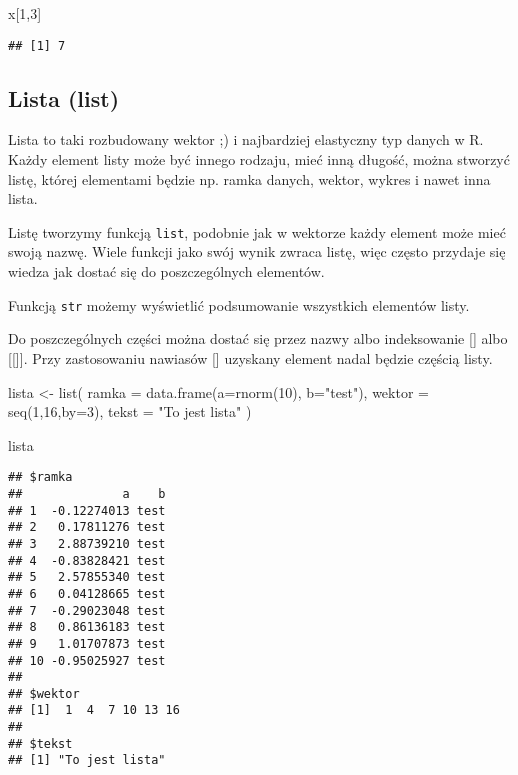 \documentclass[
]{book}
\newenvironment{Shaded}{\begin{snugshade}}{\end{snugshade}}
\newcommand{\AttributeTok}[1]{\textcolor[rgb]{0.77,0.63,0.00}{#1}}
\newcommand{\DecValTok}[1]{\textcolor[rgb]{0.00,0.00,0.81}{#1}}
\newcommand{\FunctionTok}[1]{\textcolor[rgb]{0.00,0.00,0.00}{#1}}
\newcommand{\NormalTok}[1]{#1}
\newcommand{\OtherTok}[1]{\textcolor[rgb]{0.56,0.35,0.01}{#1}}
\newcommand{\StringTok}[1]{\textcolor[rgb]{0.31,0.60,0.02}{#1}}
\begin{document}
\begin{Shaded}
\begin{Highlighting}[]
\NormalTok{x[}\DecValTok{1}\NormalTok{,}\DecValTok{3}\NormalTok{]}
\end{Highlighting}
\end{Shaded}

\begin{verbatim}
## [1] 7
\end{verbatim}

\hypertarget{lista-list}{%
\subsection{Lista (list)}\label{lista-list}}

Lista to taki rozbudowany wektor ;) i najbardziej elastyczny typ danych w R. Każdy element listy może być innego rodzaju, mieć inną długość, można stworzyć listę, której elementami będzie np. ramka danych, wektor, wykres i nawet inna lista.

Listę tworzymy funkcją \texttt{list}, podobnie jak w wektorze każdy element może mieć swoją nazwę. Wiele funkcji jako swój wynik zwraca listę, więc często przydaje się wiedza jak dostać się do poszczególnych elementów.

Funkcją \texttt{str} możemy wyświetlić podsumowanie wszystkich elementów listy.

Do poszczególnych części można dostać się przez nazwy albo indeksowanie {[}{]} albo {[}{[}{]}{]}. Przy zastosowaniu nawiasów {[}{]} uzyskany element nadal będzie częścią listy.

\begin{Shaded}
\begin{Highlighting}[]
\NormalTok{lista }\OtherTok{\textless{}{-}} \FunctionTok{list}\NormalTok{( }\AttributeTok{ramka =} \FunctionTok{data.frame}\NormalTok{(}\AttributeTok{a=}\FunctionTok{rnorm}\NormalTok{(}\DecValTok{10}\NormalTok{), }\AttributeTok{b=}\StringTok{"test"}\NormalTok{), }
               \AttributeTok{wektor =} \FunctionTok{seq}\NormalTok{(}\DecValTok{1}\NormalTok{,}\DecValTok{16}\NormalTok{,}\AttributeTok{by=}\DecValTok{3}\NormalTok{), }
               \AttributeTok{tekst =} \StringTok{"To jest lista"}\NormalTok{ )}

\NormalTok{lista}
\end{Highlighting}
\end{Shaded}

\begin{verbatim}
## $ramka
##              a    b
## 1  -0.12274013 test
## 2   0.17811276 test
## 3   2.88739210 test
## 4  -0.83828421 test
## 5   2.57855340 test
## 6   0.04128665 test
## 7  -0.29023048 test
## 8   0.86136183 test
## 9   1.01707873 test
## 10 -0.95025927 test
## 
## $wektor
## [1]  1  4  7 10 13 16
## 
## $tekst
## [1] "To jest lista"
\end{verbatim}
\end{document}
